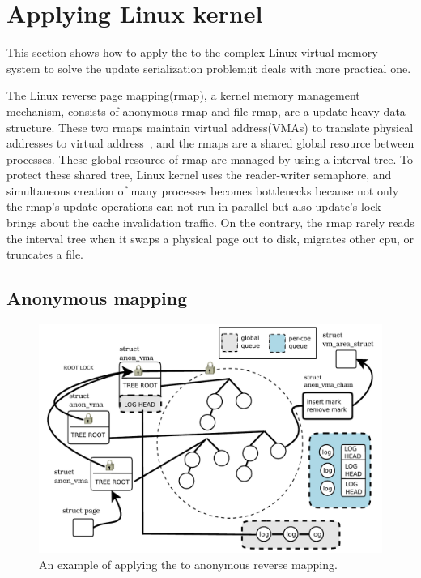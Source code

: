 \section{Applying Linux kernel}
\label{sec:linux}



This section shows how to apply the \LDU to the complex Linux
virtual memory system 
to solve the update serialization problem;it deals with more practical one.

The Linux reverse page mapping(rmap), a kernel memory management mechanism, consists
of anonymous rmap and file rmap, are a update-heavy data structure.
These two rmaps maintain virtual address(VMAs) to translate physical
addresses to virtual address~\cite{Dave2004OLSRMAP}, and the rmaps are a shared global resource between processes.
These global resource of rmap are managed by using a interval tree.
To protect these shared tree, Linux kernel uses the reader-writer semaphore, and simultaneous creation of many processes becomes bottlenecks because
not only the rmap's update operations can not run
in parallel but also update's lock brings about the cache invalidation traffic.
On the contrary, the rmap rarely reads the interval tree when it swaps a physical page
out to disk, migrates other cpu, or truncates a file.

\subsection{Anonymous mapping}

\begin{figure}[tb]
  \begin{center}
     \includegraphics[width=1\textwidth,height=1\textheight,keepaspectratio]{fig/anon_vma}
  \end{center}
  \caption{An example of applying the \LDU to anonymous reverse mapping.}
  \label{fig:anonvmaramp}
\end{figure}

